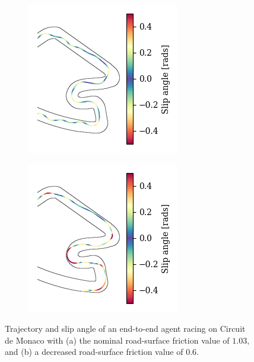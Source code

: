 \begin{figure}[htb!]
    \centering
    \begin{subfigure}[htb!]{0.45\textwidth}
        \centering
        \includegraphics[height=0.85\linewidth]{contents/chapt5/figs/uncertainty/mco_no_error_lap.png}
        \caption{}
        \label{fig:no_error}
    \end{subfigure}
    \hfill
    \begin{subfigure}[htb!]{0.45\textwidth}
        \centering
        \includegraphics[height=0.85\linewidth]{contents/chapt5/figs/uncertainty/mco_lap.png}
        \caption{}
        \label{fig:error}
    \end{subfigure}
    \caption[Trajectory and slip angle of an end-to-end agent racing on Circuit de Monaco]{Trajectory and slip angle of an end-to-end agent racing on Circuit de Monaco with (a) the nominal road-surface friction value of $1.03$, and (b) a decreased road-surface friction value of $0.6$.}
    \label{fig:mco_slip}
\end{figure}

